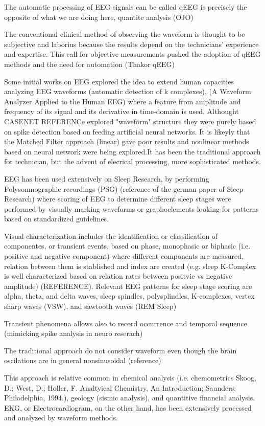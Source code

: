 \documentclass[sensors,article,submit,moreauthors,pdftex,10pt,a4paper]{mdpi}
\begin{document}
The automatic processing of EEG signals can be called qEEG is precisely the opposite of what we are doing here, quantite analysis (OJO)

The conventional clinical method of observing the waveform is thought to be subjective and laborius because the results depend on the technicians' experience and expertise.  This call for objective measurements pushed the adoption of qEEG methods and the need for automation (Thakor qEEG)


Some initial works on EEG explored the idea to extend human capacities analyzing EEG waveforms  (automatic detection of k complexes), (A Waveform Analyzer Applied to the Human EEG) where a feature from amplitude and frequency of its signal and its derivative in time-domain is used.  Althought CASENET REFERENCe explored "waveform" structure they were purely based on spike detection based on feeding artificial neural networks.  It is likeyly that the Matched Filter approach (linear) gave poor results and nonlinear methods based on neural network were being explored.It has been the traditional approach for technician, but the advent of elecrical processing, more sophisticated methods.


EEG has been used extensively on Sleep Research, by performing Polysomnographic recordings (PSG)  (reference of the german paper of Sleep Research) where scoring of EEG to determine different sleep stages were performed by visually marking waveforms or graphoelements looking for patterns based on standardized guidelines.

Visual characterization includes the identification or classification of componentes, or transient events, based on phase, monophasic or biphasic  (i.e. positive and negative component) where different components are measured, relation between them is stablished and index are created (e.g. sleep K-Complex is well characterized based on relation rates between positvie vs negative amplitude) (REFERENCE).  Relevant EEG patterns for sleep stage scoring are alpha, theta, and delta waves,
sleep spindles, polysplindles, K-complexes, vertex sharp waves (VSW), and sawtooth waves (REM Sleep)


Transient phenomena allows also to record occurrence and temporal sequence (mimicking spike analysis in neuro reserach)

The traditional approach do not consider waveform even though the brain oscilations are in general nonsinusoidal (reference)

This approach is relative common in chemical analysis (i.e. chemometrics Skoog, D.; West, D.; Holler, F. Analtyical Chemistry, An Introduction; Saunders: Philadelphia, 1994.), geology (sismic analysis), and quantitive financial analysis.  EKG, or Electrocardiogram, on the other hand, has been extensively processed and analyzed by waveform methods.
\end{document}

